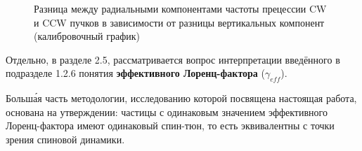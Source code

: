 \begin{figure}[H]\centering
	\caption{Разница между радиальными компонентами частоты прецессии CW и CCW пучков
		в зависимости от разницы вертикальных компонент (калибровочный график)\label{fig:calib}}
\end{figure}

Отдельно, в разделе 2.5, рассматривается вопрос интерпретации введённого в подразделе 1.2.6 понятия 
\textbf{эффективного Лоренц-фактора} ($\gamma_{eff}$). 

Больш\'{а}я часть методологии, исследованию которой посвящена настоящая работа, основана на утверждении: 
частицы с одинаковым значением эффективного Лоренц-фактора имеют одинаковый спин-тюн, 
то есть эквивалентны с точки зрения спиновой динамики.

